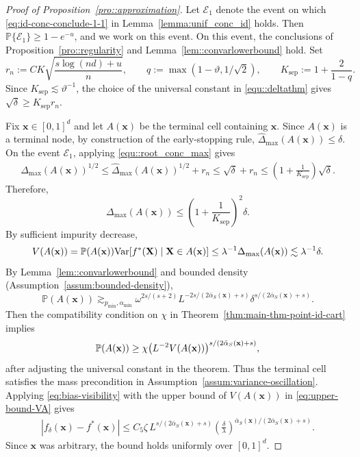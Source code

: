 \documentclass[11pt]{article}
\theoremstyle{plain}
\theoremstyle{definition}
\theoremstyle{remark}
\theoremstyle{plain}
\newcommand{\bx}{\mathbf{x}}
\newcommand{\bX}{\mathbf{X}}
\DeclarePairedDelimiter{\paren}{(}{)}
\renewcommand{\P}{\mathbb{P}}
\newcommand{\Var}{\textnormal{Var}}
\newcommand{\1}{\mathbbm{1}}
\begin{document}
\begin{proof}[Proof of Proposition~\ref{pro::approximation}]
	Let $\mathcal{E}_1$ denote the event on which 
    \eqref{eq:id-conc-conclude-1-1} in 
    Lemma~\ref{lemma:unif_conc_id} holds.
    Then $\P\{\mathcal{E}_1\} \ge 1 - e^{-u}$, and we work on this event.
    On this event, the conclusions of Proposition~\ref{pro::regularity} and Lemma~\ref{lem::convarlowerbound} hold.
    Set
    \[
    r_n:=
    C K
    \sqrt{\frac{s\log(nd)+u}{n}},
    \qquad
    q:=\max(1-\vartheta,1/\sqrt{2}),
    \qquad
    K_{\mathrm{sep}}:=1+\frac{2}{1-q}.
    \]
    Since $K_{\mathrm{sep}}\lesssim\vartheta^{-1}$, the choice of the universal
    constant in \eqref{equ::deltathm} gives
    $\sqrt{\delta}\ge K_{\mathrm{sep}}r_n$.
	
	Fix $\bx\in[0,1]^d$ and let $A(\bx)$ be the terminal cell containing $\bx$.
    Since $A(\bx)$ is a terminal node, by construction of the early-stopping rule,
    $\widehat{\Delta}_{\max}(A(\bx))\le \delta$.
    On the event $\mathcal E_1$, applying \eqref{equ::root_conc_max} gives
    \begin{align*}
    \Delta_{\max}(A(\bx))^{1/2}
    \le
    \widehat{\Delta}_{\max}(A(\bx))^{1/2}+r_n
    \le
    \sqrt{\delta}+r_n
    \le
    \left(1+\frac1{K_{\mathrm{sep}}}\right)\sqrt{\delta}.
    \end{align*}
    Therefore,
    \[
    \Delta_{\max}(A(\bx))
    \le
    \left(1+\frac1{K_{\mathrm{sep}}}\right)^2\delta .
    \]
    By sufficient impurity decrease,
    \begin{equation}\label{eq:upper-bound-VA}
        V(A(\bx))=\P(A(\bx))\Var[f^*(\bX)\mid \bX\in A(\bx)]
    \le
    \lambda^{-1}\Delta_{\max}(A(\bx))
    \lesssim \lambda^{-1}\delta .
    \end{equation}
    By Lemma~\ref{lem::convarlowerbound} and bounded density (Assumption~\ref{assum:bounded-density}),
    \[
    \P(A(\bx))
    \gtrsim_{p_{\min},\alpha_{\min}}
    \omega^{2s/(s+2)}
    L^{-2s/(2\bar\alpha_S(\bx)+s)}
    \delta^{
    s/(2\bar\alpha_S(\bx)+s)
    }.
    \]
    Then the compatibility condition on $\chi$ in Theorem~\ref{thm:main-thm-point-id-cart} implies
    \[
    \P(A(\bx))
    \ge
    \chi
    \paren*{L^{-2}V(A(\bx))}^{
    s/(2\bar\alpha_S(\bx)+s)
    },
    \]
    after adjusting the universal constant in the theorem.
    Thus the terminal cell satisfies the mass precondition in Assumption~\ref{assum:variance-oscillation}.
    Applying \eqref{eq:bias-visibility} with the upper bound of $V(A(\bx))$ in \eqref{eq:upper-bound-VA} gives
    \begin{align*}
  	|f_{\delta}(\bx)-f^*(\bx)|
	\leq C_5
    \zeta\,
    L^{s/(2\bar\alpha_S(\bx)+s)}
    \left(\frac{\delta}{\lambda}\right)^{
    \bar\alpha_S(\bx)/(2\bar\alpha_S(\bx)+s)}.
    \end{align*}
	Since $\bx$ was arbitrary, the bound holds uniformly over $[0,1]^d$.
\end{proof}
\end{document}
